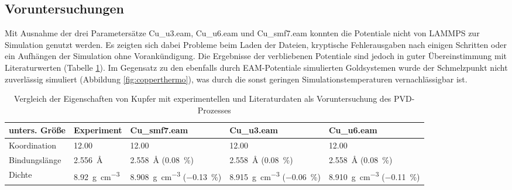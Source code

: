 \subsection{Voruntersuchungen}

Mit Ausnahme der drei Parametersätze Cu\_u3.eam, Cu\_u6.eam und Cu\_smf7.eam konnten die Potentiale nicht von LAMMPS zur Simulation genutzt werden.
Es zeigten sich dabei Probleme beim Laden der Dateien, kryptische Fehlerausgaben nach einigen Schritten oder ein Aufhängen der Simulation ohne Vorankündigung.
Die Ergebnisse der verbliebenen Potentiale sind jedoch in guter Übereinstimmung mit Literaturwerten (Tabelle \ref{tab:copperpreresults}).
Im Gegensatz zu den ebenfalls durch EAM-Potentiale simulierten Goldsystemen wurde der Schmelzpunkt nicht zuverlässig simuliert (Abbildung \ref{fig:copperthermo}), was durch die sonst geringen Simulationstemperaturen vernachlässigbar ist.

\begin{table}[tbh]
  \caption[Eigenschaften von Kupfer]{Vergleich der Eigenschaften von Kupfer mit experimentellen und Literaturdaten als Voruntersuchung des PVD-Prozesses}
  \label{tab:copperpreresults}
  \begin{tabularx}{\textwidth}{|lXXXX|}
    \hline
    \textbf{unters. Größe} & \textbf{Experiment} & \textbf{Cu\_smf7.eam} & \textbf{Cu\_u3.eam} & \textbf{Cu\_u6.eam} \\
    \hline
    Koordination   &  \SI{12.00}{} & \SI{12.00}{} & \SI{12.00}{} & \SI{12.00}{} \\
    Bindungslänge  &  \SI{2.556}{\angstrom} & \SI{2.558}{\angstrom} (\SI{0.08}{\percent}) & \SI{2.558}{\angstrom} (\SI{0.08}{\percent}) & \SI{2.558}{\angstrom} (\SI{0.08}{\percent}) \\
    Dichte         & \SI{8.92}{\gram\per\cubic\centi\meter} & \SI{8.908}{\gram\per\cubic\centi\meter} (\SI{-0.13}{\percent}) & \SI{8.915}{\gram\per\cubic\centi\meter} (\SI{-0.06}{\percent}) & \SI{8.910}{\gram\per\cubic\centi\meter}  (\SI{-0.11}{\percent}) \\
    \hline
  \end{tabularx}
\end{table}


